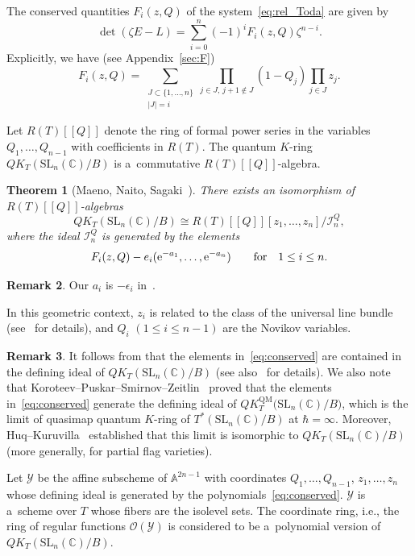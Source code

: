 \documentclass[10pt,a4paper]{amsart}
\numberwithin{equation}{section}
\newcommand{\C}{\mathbb{C}}
\newcommand{\Rep}{{R(T)}}
\newcommand{\SL}{\mathrm{SL}}
\newtheorem{Theorem}{Theorem}[section]
\theoremstyle{definition}
\newtheorem{Remark}[Theorem]{Remark}
\begin{document}
The conserved quantities $F_i(z,Q)$
of the system~\eqref{eq:rel_Toda} are given by
\[
\det(\zeta E-L)=\sum_{i=0}^n(-1)^i F_i(z,Q)\zeta^{n-i}.
\]
Explicitly, we have (see Appendix~\ref{sec:F})
\begin{equation}\label{eq:polynomialF}
F_i(z,Q)=
\sum_{\substack{J\subset \{1,\dots,n\}\\ |J|=i}}
\prod_{{j\in J,\, j+1\notin J}}(1-Q_j)\prod_{j\in J}z_j.
\end{equation}




Let $R(T)[\![Q]\!]$ denote the
ring of formal power series in the variables $Q_1,\dots,Q_{n-1}$ with coefficients in $R(T)$.
The quantum $K$-ring $QK_T(\SL_n(\C)/B)$ is a~commutative $R(T)[\![Q]\!]$-algebra.
\begin{Theorem}[Maeno, Naito, Sagaki~\cite{MNS1}]\label{thm:MNS1}
There exists an isomorphism of $R(T)[\![Q]\!]$-algebras
\[
QK_T(\SL_n(\C)/B)\cong
\Rep[\![Q]\!][z_1,\dots,z_n]/\mathscr{I}_n^Q,
\]
where the ideal $\mathscr{I}_n^Q$ is generated by the elements
\begin{equation}\label{eq:conserved}
F_i(z,Q)-e_i({\rm e}^{-a_1},\dots,{\rm e}^{-a_n})\qquad \text{for}\quad 1\le i\le n. \end{equation}
\end{Theorem}
\begin{Remark}
Our $a_i$ is $-\epsilon_i$ in~\cite{MNS1}.
\end{Remark}In this geometric
context, $z_i$ is related to the class of
the universal line bundle (see~\cite{MNS1} for details),
and $Q_i$ $(1\le i\le n-1)$ are the Novikov variables.

\begin{Remark}\label{rem:KPSZ}
It follows from \cite[Corollary~2]{GL} that the elements in~\eqref{eq:conserved} are contained in the defining ideal of $QK_T(\SL_n(\C)/B)$ (see also~\cite{ACT, MNS1} for details).
We also note that Koroteev--Puskar--Smirnov--Zeitlin~\cite{KPSZ} proved that the elements in~\eqref{eq:conserved} generate the defining ideal of $
QK_T^{\mathrm{QM}}\bigl(\SL_n(\C)/B\bigr)$,
which is the limit of quasimap quantum $K$-ring of $T^*(\SL_n(\C)/B)$ at $\hbar = \infty$.
Moreover, Huq--Kuruvilla~\cite{HK} established that this limit is isomorphic to $QK_T(\SL_n(\C)/B)$ (more generally, for partial flag varieties).
\end{Remark}

Let $\mathscr{Y}$ be the affine subscheme
of $\mathbb{A}^{2n-1}$ with coordinates
$Q_1,\dots,Q_{n-1}$, $z_1,\dots,z_n$
whose defining ideal is generated by the polynomials~\eqref{eq:conserved}.
$\mathscr{Y}$ is a~scheme over $T$ whose fibers are the isolevel sets.
The coordinate ring, i.e., the ring of regular functions $\mathscr{O}(\mathscr{Y})$ is
considered to be a~polynomial version \smash{$QK_T^{\mathrm{pol}}(\SL_n(\C)/B)$} of $QK_T(\SL_n(\C)/B)$.
\end{document}
